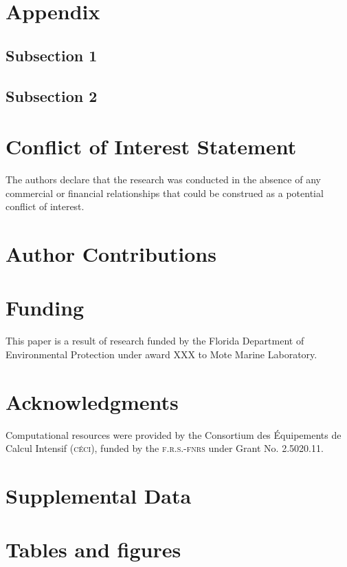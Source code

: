 \documentclass[utf8]{frontiersSCNS}
\begin{document}

\section*{Appendix}

\subsection*{Subsection 1}
\subsection*{Subsection 2}

\section*{Conflict of Interest Statement}
The authors declare that the research was conducted in the absence of any commercial or financial relationships that could be construed as a potential conflict of interest.

\section*{Author Contributions}
  
\section*{Funding}
This paper is a result of research funded by the Florida Department of Environmental Protection under award XXX to Mote Marine Laboratory. 

\section*{Acknowledgments}
Computational resources were provided by the Consortium des \'Equipements de Calcul Intensif (\textsc{c\'eci}), funded by the \textsc{f.r.s.-fnrs} under Grant No. 2.5020.11.

\section*{Supplemental Data}

 



\section*{Tables and figures}
\end{document}
